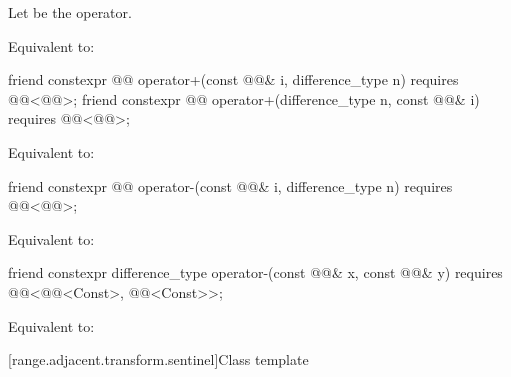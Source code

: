 \begin{itemdescr}
\pnum
Let  be the operator.

\pnum
\effects
Equivalent to: 
\end{itemdescr}

%
\begin{itemdecl}
friend constexpr @@ operator+(const @@& i, difference_type n)
  requires @@<@@>;
friend constexpr @@ operator+(difference_type n, const @@& i)
  requires @@<@@>;
\end{itemdecl}

\begin{itemdescr}
\pnum
\effects
Equivalent to: 
\end{itemdescr}

%
\begin{itemdecl}
friend constexpr @@ operator-(const @@& i, difference_type n)
  requires @@<@@>;
\end{itemdecl}

\begin{itemdescr}
\pnum
\effects
Equivalent to: 
\end{itemdescr}

%
\begin{itemdecl}
friend constexpr difference_type operator-(const @@& x, const @@& y)
  requires @@<@@<Const>, @@<Const>>;
\end{itemdecl}

\begin{itemdescr}
\pnum
\effects
Equivalent to: 
\end{itemdescr}

[range.adjacent.transform.sentinel]{Class template }

